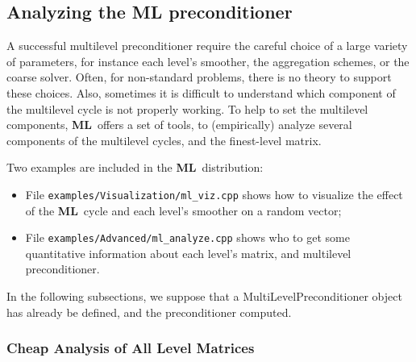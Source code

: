 \documentclass{article}[11pt]
\newcommand{\ML}     {{\bf ML}}
\begin{document}

\subsection{Analyzing the ML preconditioner}
\label{sec:MLP:analyze}

A successful multilevel preconditioner require the careful choice
of a large variety of parameters, for instance 
each level's smoother, the aggregation schemes, or the coarse solver.
Often, for non-standard problems, there is no theory to support these choices.
Also, sometimes it is difficult to understand which component of the
multilevel cycle is not properly working. To help to set the multilevel
components, \ML~offers a set of tools, to (empirically)
analyze several components of the multilevel cycles, and the finest-level
matrix.

Two examples are included in the \ML~distribution:
\begin{itemize}
\item File \verb!examples/Visualization/ml_viz.cpp! shows how to
visualize the effect of the \ML~cycle and each level's smoother on a random vector;
\item File \verb!examples/Advanced/ml_analyze.cpp! shows who to
get some quantitative information about each level's matrix, and multilevel preconditioner.
\end{itemize}

In the following subsections, we suppose that a MultiLevelPreconditioner 
object has already be defined,
and the preconditioner computed. 


\subsubsection{Cheap Analysis of All Level Matrices}
\end{document}
